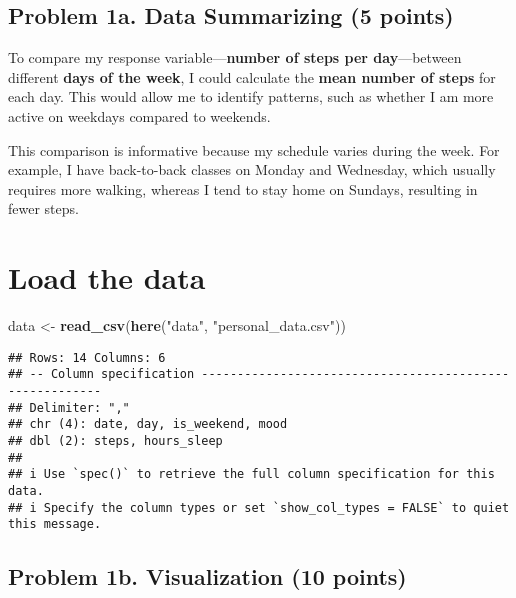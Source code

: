 \documentclass[
]{article}
\newenvironment{Shaded}{\begin{snugshade}}{\end{snugshade}}
\newcommand{\FunctionTok}[1]{\textcolor[rgb]{0.13,0.29,0.53}{\textbf{#1}}}
\newcommand{\NormalTok}[1]{#1}
\newcommand{\OtherTok}[1]{\textcolor[rgb]{0.56,0.35,0.01}{#1}}
\newcommand{\StringTok}[1]{\textcolor[rgb]{0.31,0.60,0.02}{#1}}
\begin{document}
\subsection{Problem 1a. Data Summarizing (5
points)}\label{problem-1a.-data-summarizing-5-points}

To compare my response variable---\textbf{number of steps per
day}---between different \textbf{days of the week}, I could calculate
the \textbf{mean number of steps} for each day. This would allow me to
identify patterns, such as whether I am more active on weekdays compared
to weekends.

This comparison is informative because my schedule varies during the
week. For example, I have back-to-back classes on Monday and Wednesday,
which usually requires more walking, whereas I tend to stay home on
Sundays, resulting in fewer steps.

\section{Load the data}\label{load-the-data}

\begin{Shaded}
\begin{Highlighting}[]
\NormalTok{data }\OtherTok{\textless{}{-}} \FunctionTok{read\_csv}\NormalTok{(}\FunctionTok{here}\NormalTok{(}\StringTok{"data"}\NormalTok{, }\StringTok{"personal\_data.csv"}\NormalTok{))}
\end{Highlighting}
\end{Shaded}

\begin{verbatim}
## Rows: 14 Columns: 6
## -- Column specification --------------------------------------------------------
## Delimiter: ","
## chr (4): date, day, is_weekend, mood
## dbl (2): steps, hours_sleep
## 
## i Use `spec()` to retrieve the full column specification for this data.
## i Specify the column types or set `show_col_types = FALSE` to quiet this message.
\end{verbatim}

\subsection{Problem 1b. Visualization (10
points)}\label{problem-1b.-visualization-10-points}
\end{document}
